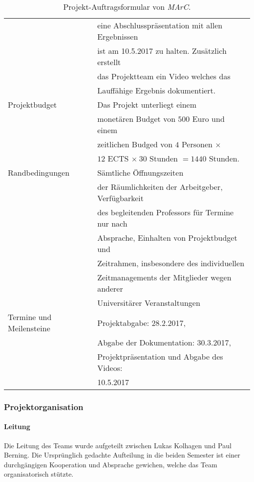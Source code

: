 \begin{table}
\begin{tabularx}{\textwidth}{|l|l|}
	& eine Abschlusspräsentation mit allen Ergebnissen\\
	& ist am 10.5.2017 zu halten. Zusätzlich erstellt\\
	&das Projektteam ein Video welches das\\
	& Lauffähige Ergebnis dokumentiert.\\	
	\hline
	Projektbudget & Das Projekt unterliegt einem\\
	& monetären Budget von $500$ Euro und einem\\
	& zeitlichen Budged von $4$ Personen $\times$ \\
	&$12$ ECTS $\times \ 30$ Stunden $ = 1440$ Stunden.\\
	\hline
	Randbedingungen & Sämtliche Öffnungszeiten\\
	& der Räumlichkeiten der Arbeitgeber, Verfügbarkeit\\
	& des begleitenden Professors für Termine nur nach \\
	&Absprache, Einhalten von Projektbudget und \\
	&Zeitrahmen, insbesondere des individuellen \\
	&Zeitmanagements der Mitglieder wegen anderer\\
	& Universitärer Veranstaltungen\\
	\hline
	Termine und Meilensteine & Projektabgabe: 28.2.2017, \\
	&Abgabe der Dokumentation: 30.3.2017, \\
	&Projektpräsentation und Abgabe des Videos: \\
	&10.5.2017\\
	\hline
	\end{tabularx}
	\caption[Projekt-Auftragsformular von \emph{MArC}]{Projekt-Auftragsformular von \emph{MArC}.}
	\label{tab:Projektformular}
\end{table}

\subsubsection{Projektorganisation}
\paragraph{Leitung} Die Leitung des Teams wurde aufgeteilt zwischen Lukas Kolhagen und Paul Berning. Die Ursprünglich gedachte Aufteilung in die beiden Semester ist einer durchgängigen Kooperation und Absprache gewichen, welche das Team organisatorisch stützte.
